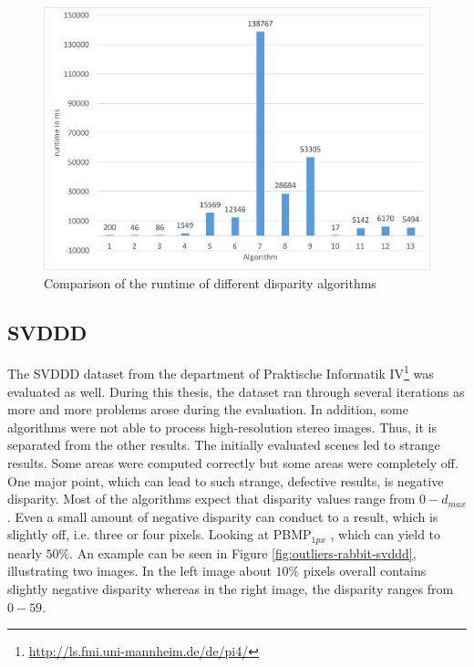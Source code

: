 \begin{figure}[h!]
\centering
\includegraphics[width=1.0\textwidth]{src/images/evaluation/plots/runtime.pdf}
\caption[Comparison of the runtime of different disparity algorithms]{Comparison of the runtime of different disparity algorithms}
\label{fig:eval-plots-runtime}
\end{figure}






\subsection{SVDDD}

The SVDDD dataset from the department of Praktische Informatik IV\footnote{\url{http://ls.fmi.uni-mannheim.de/de/pi4/}} was evaluated as well.
During this thesis, the dataset ran through several iterations as more and more problems arose during the evaluation.
In addition, some algorithms were not able to process high-resolution stereo images.
Thus, it is separated from the other results.
\newline\newline\noindent The initially evaluated scenes led to strange results.
Some areas were computed correctly but some areas were completely off.
One major point, which can lead to such strange, defective results, is negative disparity.
Most of the algorithms expect that disparity values range from $0-d_{max}$.
Even a small amount of negative disparity can conduct to a result, which is slightly off, i.e. three or four pixels.
Looking at PBMP$_{1px}$ , which can yield to nearly $50\%$.
An example can be seen in Figure \ref{fig:outliers-rabbit-svddd}, illustrating two images.
In the left image about $10\%$ pixels overall contains slightly negative disparity whereas in the right image, the disparity ranges from $0-59$.

